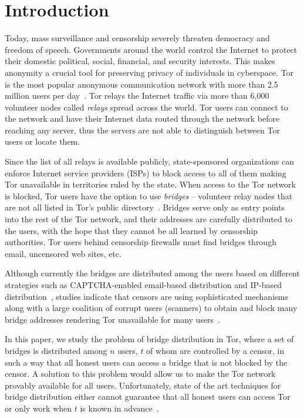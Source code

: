 \section{Introduction}
Today, mass surveillance and censorship severely threaten democracy and freedom of speech. Governments around the world control the Internet to protect their domestic political, social, financial, and security interests. This makes anonymity a crucial tool for preserving privacy of individuals in cyberspace. Tor~\cite{dingledine:2004} is the most popular anonymous communication network with more than 2.5 million users per day~\cite{Tor:Users}. Tor relays the Internet traffic via more than 6,000 volunteer nodes called \emph{relays} spread across the world. Tor users can connect to the network and have their Internet data routed through the network before reaching any server, thus the servers are not able to distinguish between Tor users or locate them. 

Since the list of all relays is available publicly, state-sponsored organizations can enforce Internet service providers (ISPs) to block access to all of them making Tor unavailable in territories ruled by the state. When access to the Tor network is blocked, Tor users have the option to use \emph{bridges} -- volunteer relay nodes that are not all listed in Tor's public directory~\cite{Dingledine06designof}. Bridges serve only as entry points into the rest of the Tor network, and their addresses are carefully distributed to the users, with the hope that they cannot be all learned by censorship authorities. Tor users behind censorship firewalls must find bridges through email, uncensored web sites, etc.

Although currently the bridges are distributed among the users based on different strategies such as CAPTCHA-enabled email-based distribution and IP-based distribution~\cite{Dingledine06designof}, studies indicate that censors are using sophisticated mechanisms along with a large coalition of corrupt users (scanners) to obtain and block many bridge addresses rendering Tor unavailable for many users~\cite{Dingledine:Bridges:2011,BridgeBlockingChina:2012,Ensafi2015b}.

In this paper, we study the problem of bridge distribution in Tor, where a set of bridges is distributed among $n$ users, $t$ of whom are controlled by a censor, in such a way that all honest users can access a bridge that is not blocked by the censor. A solution to this problem would allow us to make the Tor network provably available for all users.
Unfortunately, state of the art techniques for bridge distribution either cannot guarantee that all honest users can access Tor~\cite{WangLBH:rBridge:13,McCoy:FC:2011} or only work when $t$ is known in advance~\cite{Mahdian:2010}. 


